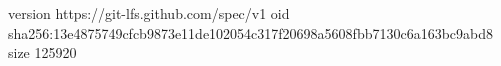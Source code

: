 version https://git-lfs.github.com/spec/v1
oid sha256:13e4875749cfcb9873e11de102054c317f20698a5608fbb7130c6a163bc9abd8
size 125920
